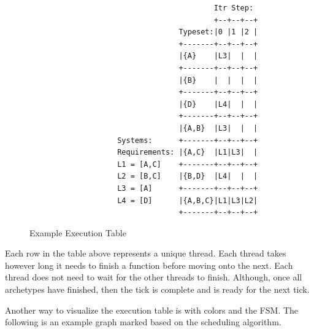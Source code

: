 \begin{figure}[H]
    \centering
    \begin{verbatim}
                                          Itr Step:                                          
                                          +--+--+--+                                         
                                  Typeset:|0 |1 |2 |                                         
                                  +-------+--+--+--+                                         
                                  |{A}    |L3|  |  |                                         
                                  +-------+--+--+--+                                         
                                  |{B}    |  |  |  |                                         
                                  +-------+--+--+--+                                         
                                  |{D}    |L4|  |  |                                         
                                  +-------+--+--+--+                                         
                                  |{A,B}  |L3|  |  |                                         
                    Systems:      +-------+--+--+--+                                         
                    Requirements: |{A,C}  |L1|L3|  |                                         
                    L1 = [A,C]    +-------+--+--+--+                                         
                    L2 = [B,C]    |{B,D}  |L4|  |  |                                         
                    L3 = [A]      +-------+--+--+--+                                         
                    L4 = [D]      |{A,B,C}|L1|L3|L2|                                         
                                  +-------+--+--+--+                                                                               
    \end{verbatim}
    \caption{Example Execution Table}
    \label{fig:exec_table}
\end{figure}

Each row in the table above represents a unique thread. Each thread takes however long it needs to finish a function before moving onto the next. Each thread does not need to wait for the other threads to finish. Although, once all archetypes have finished, then the tick is complete and is ready for the next tick. 

Another way to visualize the execution table is with colors and the FSM. The following is an example graph marked based on the scheduling algorithm.

